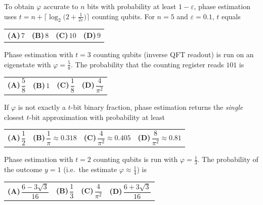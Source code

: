 \documentclass[11pt,a4paper]{article}
\newcommand{\optlabel}[1]{\textbf{(#1)}}
\newenvironment{qitem}[1]{\begin{list}{}{\setlength{\leftmargin}{3.3em}\setlength{\labelwidth}{3.1em}%
  \setlength{\labelsep}{0.2em}\setlength{\topsep}{3pt}\setlength{\parsep}{3pt}}\item[\textbf{Q.#1}\hfill]}{\end{list}}
\newcommand{\qsep}{\par\vspace{2pt}{\color{black!15}\hrule}\vspace{4pt}}
\begin{document}
\begin{qitem}{64}
To obtain $\varphi$ accurate to $n$ bits with probability at least $1 - \varepsilon$, phase estimation uses
$t = n + \big\lceil \log_2\!\big(2 + \frac{1}{2\varepsilon}\big)\big\rceil$ counting qubits. For $n = 5$ and $\varepsilon = 0.1$, $t$ equals
\par\smallskip\noindent\begin{tabularx}{\linewidth}{@{}*{4}{L}@{}}
\optlabel{A}\,$7$ & \optlabel{B}\,$8$ & \optlabel{C}\,$10$ & \optlabel{D}\,$9$
\end{tabularx}
\end{qitem}
\qsep

\begin{qitem}{65}
Phase estimation with $t = 3$ counting qubits (inverse QFT readout) is run on an eigenstate with $\varphi = \frac58$.
The probability that the counting register reads $101$ is
\par\smallskip\noindent\begin{tabularx}{\linewidth}{@{}*{4}{L}@{}}
\optlabel{A}\,$\dfrac58$ & \optlabel{B}\,$1$ & \optlabel{C}\,$\dfrac18$ & \optlabel{D}\,$\dfrac{4}{\pi^2}$
\end{tabularx}
\end{qitem}
\qsep

\begin{qitem}{66}
If $\varphi$ is not exactly a $t$-bit binary fraction, phase estimation returns the \emph{single} closest $t$-bit
approximation with probability at least
\par\smallskip\noindent\begin{tabularx}{\linewidth}{@{}*{4}{L}@{}}
\optlabel{A}\,$\dfrac12$ & \optlabel{B}\,$\dfrac1\pi \approx 0.318$ & \optlabel{C}\,$\dfrac{4}{\pi^2} \approx 0.405$ & \optlabel{D}\,$\dfrac{8}{\pi^2} \approx 0.81$
\end{tabularx}
\end{qitem}
\qsep

\begin{qitem}{67}
Phase estimation with $t = 2$ counting qubits is run with $\varphi = \frac13$. The probability of the outcome $y = 1$
(i.e.\ the estimate $\varphi \approx \frac14$) is
\par\smallskip\noindent\begin{tabularx}{\linewidth}{@{}*{4}{L}@{}}
\optlabel{A}\,$\dfrac{6 - 3\sqrt3}{16}$ & \optlabel{B}\,$\dfrac13$ & \optlabel{C}\,$\dfrac{4}{\pi^2}$ & \optlabel{D}\,$\dfrac{6 + 3\sqrt3}{16}$
\end{tabularx}
\end{qitem}
\qsep
\end{document}
